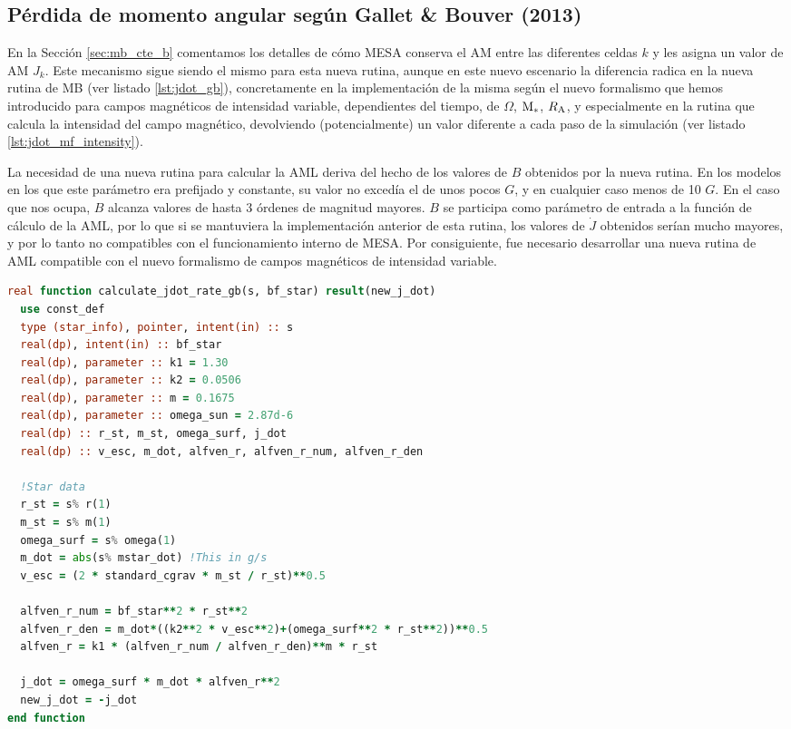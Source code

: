 \subsection{Pérdida de momento angular según Gallet \& Bouver (2013)} \label{sec:dist_aml2}
En la Sección \ref{sec:mb_cte_b} comentamos los detalles de cómo MESA conserva el AM entre las diferentes celdas $k$ y les asigna un valor de AM $J_k$. Este mecanismo sigue siendo el mismo para esta nueva rutina, aunque en este nuevo escenario la diferencia radica en la nueva rutina de MB (ver listado \ref{lst:jdot_gb}), concretamente en la implementación de la misma según el nuevo formalismo que hemos introducido para campos magnéticos de intensidad variable, dependientes del tiempo, de $\Omega$, $\mathrm{M}_*$, $R_{\mathrm{A}}$, y especialmente en la rutina que calcula la intensidad del campo magnético, devolviendo (potencialmente) un valor diferente a cada paso de la simulación (ver listado \ref{lst:jdot_mf_intensity}).\par

La necesidad de una nueva rutina para calcular la AML deriva del hecho de los valores de $B$ obtenidos por la nueva rutina. En los modelos en los que este parámetro era prefijado y constante, su valor no excedía el de unos pocos $G$, y en cualquier caso menos de 10 $G$. En el caso que nos ocupa, $B$ alcanza valores de hasta 3 órdenes de magnitud mayores. $B$ se participa como parámetro de entrada a la función de cálculo de la AML, por lo que si se mantuviera la implementación anterior de esta rutina, los valores de $\Dot{J}$ obtenidos serían mucho mayores, y por lo tanto no compatibles con el funcionamiento interno de MESA. Por consiguiente, fue necesario desarrollar una nueva rutina de AML compatible con el nuevo formalismo de campos magnéticos de intensidad variable.  

\begin{lstlisting}[language=Fortran, float, caption={Rutina de par de torsión para un campo magnético de intensidad variable.}, label={lst:jdot_gb}]
real function calculate_jdot_rate_gb(s, bf_star) result(new_j_dot)
  use const_def
  type (star_info), pointer, intent(in) :: s
  real(dp), intent(in) :: bf_star
  real(dp), parameter :: k1 = 1.30
  real(dp), parameter :: k2 = 0.0506
  real(dp), parameter :: m = 0.1675
  real(dp), parameter :: omega_sun = 2.87d-6
  real(dp) :: r_st, m_st, omega_surf, j_dot
  real(dp) :: v_esc, m_dot, alfven_r, alfven_r_num, alfven_r_den
      
  !Star data
  r_st = s% r(1)
  m_st = s% m(1)
  omega_surf = s% omega(1)
  m_dot = abs(s% mstar_dot) !This in g/s
  v_esc = (2 * standard_cgrav * m_st / r_st)**0.5
      
  alfven_r_num = bf_star**2 * r_st**2
  alfven_r_den = m_dot*((k2**2 * v_esc**2)+(omega_surf**2 * r_st**2))**0.5
  alfven_r = k1 * (alfven_r_num / alfven_r_den)**m * r_st
      
  j_dot = omega_surf * m_dot * alfven_r**2
  new_j_dot = -j_dot
end function	
\end{lstlisting}

